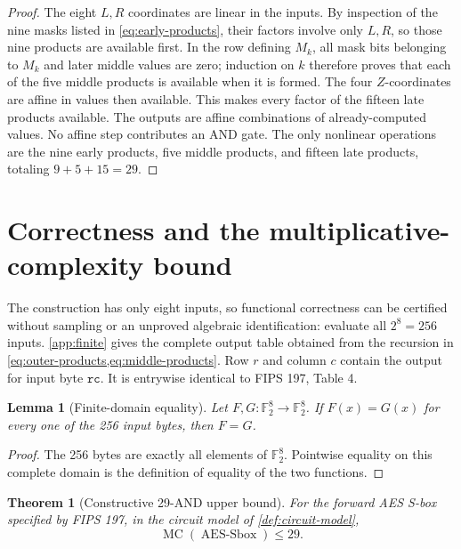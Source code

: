 \documentclass[11pt]{article}
\newtheorem{theorem}{Theorem}
\newtheorem{lemma}[lemma]{Lemma}
\theoremstyle{definition}
\newcommand{\F}{\mathbb F}
\newcommand{\AES}{\operatorname{AES\mbox{-}Sbox}}
\newcommand{\MC}{\operatorname{MC}}
\begin{document}
\begin{proof}
The eight \(L,R\) coordinates are linear in the inputs.  By inspection of the nine masks listed in
\cref{eq:early-products}, their factors involve only \(L,R\), so those nine products are available
first.  In the row defining \(M_k\), all mask bits belonging to \(M_k\) and later middle values are
zero; induction on \(k\) therefore proves that each of the five middle products is available when it
is formed.  The four \(Z\)-coordinates are affine in values then available.  This makes every factor
of the fifteen late products available.  The outputs are affine combinations of already-computed
values.  No affine step contributes an AND gate.  The only nonlinear operations are the nine early
products, five middle products, and fifteen late products, totaling \(9+5+15=29\).
\end{proof}

\section{Correctness and the multiplicative-complexity bound}
\label{sec:correctness}

The construction has only eight inputs, so functional correctness can be certified without sampling
or an unproved algebraic identification: evaluate all \(2^8=256\) inputs.  \cref{app:finite} gives the complete output table obtained from the recursion in
\cref{eq:outer-products,eq:middle-products}.  Row \(r\) and column \(c\) contain the output for input
byte \(\mathtt{rc}\).  It is entrywise identical to FIPS 197, Table 4.

\begin{lemma}[Finite-domain equality]
\label{lem:finite-domain}
Let \(F,G:\F_2^8\to\F_2^8\).  If \(F(x)=G(x)\) for every one of the 256 input bytes, then
\(F=G\).
\end{lemma}

\begin{proof}
The 256 bytes are exactly all elements of \(\F_2^8\).  Pointwise equality on this complete domain is
the definition of equality of the two functions.
\end{proof}

\begin{theorem}[Constructive 29-AND upper bound]
\label{thm:main}
For the forward AES S-box specified by FIPS 197, in the circuit model of
\cref{def:circuit-model},
\[
  \MC(\AES)\leq 29.
\]
\end{theorem}
\end{document}
